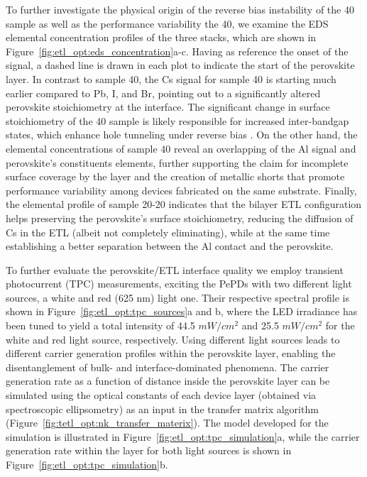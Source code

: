 To further investigate the physical origin of the reverse bias instability of the 40 sample as well as the performance variability the 40, we examine the EDS elemental concentration profiles of the three stacks, which are shown in Figure~\ref{fig:etl_opt:eds_concentration}a-c. Having as reference the onset of the  signal, a dashed line is drawn in each plot to indicate the start of the perovskite layer. In contrast to sample 40, the Cs signal for sample 40 is starting much earlier compared to Pb, I, and Br, pointing out to a significantly altered perovskite stoichiometry at the interface. The significant change in surface stoichiometry of the 40 sample is likely responsible for increased inter-bandgap states, which enhance hole tunneling under reverse bias \cite{Huang2018IntrinsicCsPbI3, Kang2017HighCsPbBr3, Chu2020SoftDefects}. On the other hand, the elemental concentrations of sample 40 reveal an overlapping of the Al signal and perovskite's constituents elements, further supporting the claim for incomplete surface coverage by the  layer and the creation of metallic shorts that promote performance variability among devices fabricated on the same substrate. Finally, the elemental profile of sample 20-20 indicates that the bilayer ETL configuration helps preserving the perovskite's surface stoichiometry, reducing the diffusion of Cs in the ETL (albeit not completely eliminating), while at the same time establishing a better separation between the Al contact and the perovskite. 


To further evaluate the perovskite/ETL interface quality we employ transient photocurrent (TPC) measurements, exciting the PePDs with two different light sources, a white and red (625 nm) light one. Their respective spectral profile is shown in Figure~\ref{fig:etl_opt:tpc_sources}a and b, where the LED irradiance has been tuned to yield a total intensity of 44.5 $mW/cm^2$ and 25.5 $mW/cm^2$ for the white and red light source, respectively. Using different light sources leads to different carrier generation profiles within the perovskite layer, enabling the disentanglement of bulk- and interface-dominated phenomena. The carrier generation rate as a function of distance inside the perovskite layer can be simulated using the optical constants of each device layer (obtained via spectroscopic ellipsometry) as an input in the transfer matrix algorithm (Figure~\ref{fig:tetl_opt:nk_transfer_materix})\cite{Burkhard2010AccountingCells}. The model developed for the simulation is illustrated in Figure~\ref{fig:etl_opt:tpc_simulation}a, while  the carrier generation rate within the  layer for both light sources is shown in Figure~\ref{fig:etl_opt:tpc_simulation}b. 


